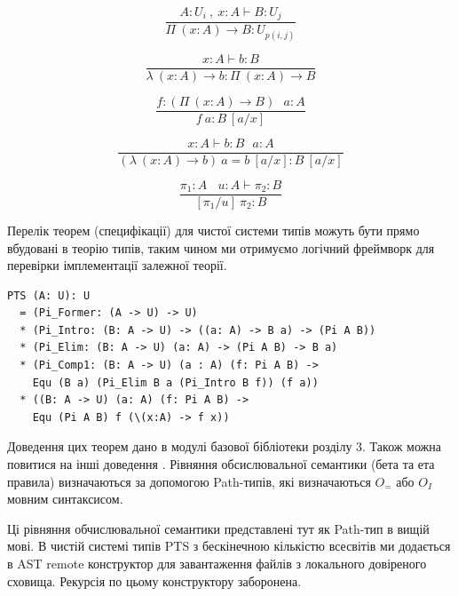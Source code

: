 \begin{definition}
\begin{definition}
\begin{definition}
\begin{definition}
\begin{equation}
\tag{$\Pi$-formation}
\dfrac
{A:U_i\ ,\ x:A \vdash B : U_j}
{\Pi\ (x:A) \rightarrow B : U_{p(i,j)}}
\end{equation}

\begin{equation}
\tag{$\lambda$-intro}
\dfrac
{x:A \vdash b : B}
{\lambda\ (x:A) \rightarrow b : \Pi\ (x: A) \rightarrow B }
\end{equation}

\begin{equation}
\tag{$App$-elimination}
\dfrac
{f: (\Pi\ (x:A) \rightarrow B)\ \ \ a: A}
{f\ a : B\ [a/x]}
\end{equation}

\begin{equation}
\tag{$\beta$-computation}
\dfrac
{x:A \vdash b: B\ \ \ a:A}
{(\lambda\ (x:A) \rightarrow b)\ a = b\ [a/x] : B\ [a/x]}
\end{equation}

\begin{equation}
\tag{subst}
\dfrac
{\pi_1 : A\ \ \ \ u:A \vdash \pi_2 : B}
{[\pi_1/u]\ \pi_2 : B}
\end{equation}

Перелік теорем (специфікації) для чистої системи типів можуть бути
прямо вбудовані в теорію типів, таким чином ми отримуємо логічний фреймворк
для перевірки імплементації залежної теорії.

\begin{lstlisting}[mathescape=true]
PTS (A: U): U
  = (Pi_Former: (A -> U) -> U)
  * (Pi_Intro: (B: A -> U) -> ((a: A) -> B a) -> (Pi A B))
  * (Pi_Elim: (B: A -> U) (a: A) -> (Pi A B) -> B a)
  * (Pi_Comp1: (B: A -> U) (a : A) (f: Pi A B) ->
    Equ (B a) (Pi_Elim B a (Pi_Intro B f)) (f a))
  * ((B: A -> U) (a: A) (f: Pi A B) ->
    Equ (Pi A B) f (\(x:A) -> f x))
\end{lstlisting}

Доведення цих теорем дано в модулі базової бібліотеки розділу 3.
Також можна повитися на інші доведення \cite{Henk93}.
Рівняння обсислювальної семантики (бета та ета правила) визначаються
за допомогою Path-типів, які визначаються $O_=$ або $O_I$ мовним синтаксисом.

Ці рівняння обчислювальної семантики представлені тут як Path-тип в вищій мові.
В чистій системі типів PTS з бескінечною кількістю всесвітів ми додається в AST
remote конструктор для завантаження файлів з локального довіреного сховища.
Рекурсія по цьому конструктору заборонена.


\end{definition}
\end{definition}
\end{definition}
\end{definition}
